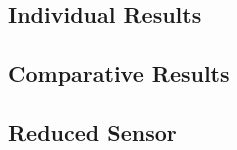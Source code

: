 \cleardoublepage
\appendix
\chapter*{\appendixname}
\ihead{\appendixname}								%

\section{Individual Results}
\label{app:individual_results}

\section{Comparative Results}
\label{app:comparative_results}

\section{Reduced Sensor}
\label{app:reduced_sensor}